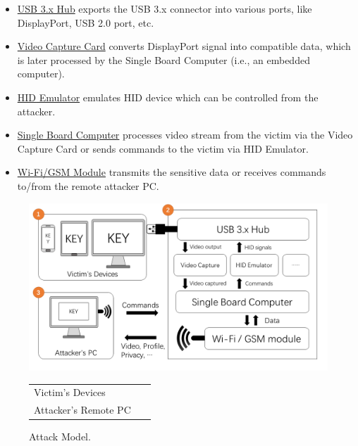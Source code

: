 \begin{itemize}
	
	\item\underline{USB 3.x Hub} exports the \ac{USB} 3.x connector into various ports, like DisplayPort, \ac{USB} 2.0 port, etc.
	
	\item\underline{Video Capture Card} converts DisplayPort signal into compatible data, which is later processed by the Single Board Computer (i.e., an embedded computer).
	
	\item\underline{\ac{HID} Emulator} emulates \ac{HID} device which can be controlled from the attacker.
	
	\item\underline{Single Board Computer} processes video stream from the victim via the Video Capture Card or sends commands to the victim via \ac{HID} Emulator.
	
	\item\underline{Wi-Fi/GSM Module} transmits the sensitive data or receives commands to/from the remote attacker PC.

\end{itemize}


\begin{figure}[t]
	\centering
	\includegraphics[width=\linewidth]{./Figs/attack_model.png}

	\begin{tabular}{ll}
	\circled[text=white,fill=myyellow]{\footnotesize{1}} Victim's Devices    &\circled[text=white,fill=myyellow]{\footnotesize{2}}~\tool\\
	\circled[text=white,fill=myyellow]{\footnotesize{3}} Attacker's Remote PC
	\end{tabular}

	\caption{Attack Model.}%
	\label{fig:attack_model}
\end{figure}

